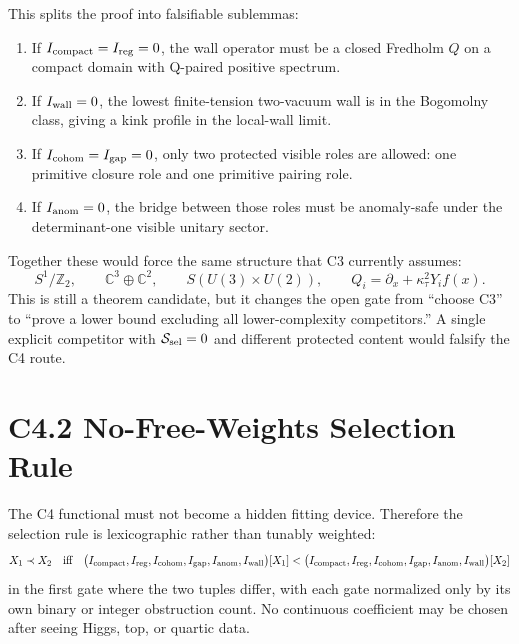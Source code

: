 \documentclass[11pt]{article}
\begin{document}
This splits the proof into falsifiable sublemmas:
\begin{enumerate}
\item If $I_{\rm compact}=I_{\rm reg}=0$, the wall operator must be a closed
Fredholm $Q$ on a compact domain with Q-paired positive spectrum.
\item If $I_{\rm wall}=0$, the lowest finite-tension two-vacuum wall is in the
Bogomolny class, giving a kink profile in the local-wall limit.
\item If $I_{\rm cohom}=I_{\rm gap}=0$, only two protected visible roles are
allowed: one primitive closure role and one primitive pairing role.
\item If $I_{\rm anom}=0$, the bridge between those roles must be anomaly-safe
under the determinant-one visible unitary sector.
\end{enumerate}
Together these would force the same structure that C3 currently assumes:
\begin{equation}
S^1/\mathbb Z_2,\qquad
\mathbb C^3\oplus\mathbb C^2,\qquad
S(U(3)\times U(2)),\qquad
Q_i=\partial_x+\kappa_\tau^2Y_if(x).
\end{equation}
This is still a theorem candidate, but it changes the open gate from ``choose
C3'' to ``prove a lower bound excluding all lower-complexity competitors.''  A
single explicit competitor with ${\cal S}_{\rm sel}=0$ and different
protected content would falsify the C4 route.

\section{C4.2 No-Free-Weights Selection Rule}
The C4 functional must not become a hidden fitting device.  Therefore the
selection rule is lexicographic rather than tunably weighted:
\begin{equation}
X_1\prec X_2
\quad\hbox{iff}\quad
\big(I_{\rm compact},I_{\rm reg},I_{\rm cohom},I_{\rm gap},
I_{\rm anom},I_{\rm wall}\big)[X_1]
<
\big(I_{\rm compact},I_{\rm reg},I_{\rm cohom},I_{\rm gap},
I_{\rm anom},I_{\rm wall}\big)[X_2]
\end{equation}
in the first gate where the two tuples differ, with each gate normalized only by
its own binary or integer obstruction count.  No continuous coefficient may be
chosen after seeing Higgs, top, or quartic data.
\end{document}
